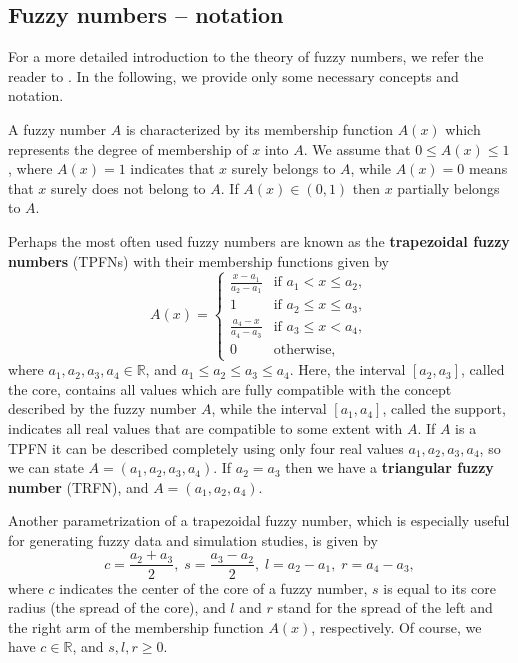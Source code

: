 \subsection{Fuzzy numbers -- notation}

For a more detailed introduction to the theory of fuzzy numbers,  we refer the reader to \cite{ban_coroianu_pg}.
In the following, we provide only some necessary concepts and notation.

A fuzzy number $A$ is characterized by its membership function $A(x)$ which represents the degree of membership of $x$ into $A$. We assume that $0\leqslant A(x)\leqslant 1$, where $A(x)=1$ indicates that $x$ surely belongs to $A$, while $A(x)=0$ means that $x$ surely does not belong to $A$. If $A(x)\in (0,1)$ then $x$ partially belongs to $A$.

Perhaps the most often used fuzzy numbers are known as the \textbf{trapezoidal fuzzy numbers} (TPFNs) with their membership functions given by
\begin{equation}
A(x)=\begin{cases}
\frac{x-a_1}{a_2-a_1} & \text{if } a_1<x\leqslant a_2, \\
1 & \text{if } a_2\leqslant x\leqslant a_3, \\
\frac{a_4-x}{a_4-a_3} & \text{if } a_3\leqslant x<a_4, \\
0 & \text{otherwise},
\end{cases}
\label{eq:TPFN} 
\end{equation}
where $a_1,a_2,a_3,a_4\in\mathbb{R}$, and $a_1\leqslant a_2\leqslant a_3\leqslant a_4$. Here, the interval $[a_2,a_3]$, called the core, contains
all values which are fully compatible with the concept described by the fuzzy number $A$, while the interval $[a_1,a_4]$, called the support, indicates all real values that are compatible to some extent with $A$.
If $A$ is a TPFN it can be described completely using only four real values $a_1,a_2,a_3,a_4$, so we can state $A=(a_1, a_2, a_3, a_4)$.
If $a_2=a_3$ then we have a \textbf{triangular fuzzy number} (TRFN), and $A = (a_1, a_2, a_4)$.

Another parametrization of a trapezoidal fuzzy number, which is especially useful for generating fuzzy data and simulation studies, is given by
\begin{equation}
c  =\frac{a_2+a_3}{2}, \; 
s =\frac{a_3-a_2}{2}, \;
l =a_2-a_1, \;
r =a_4-a_3 ,
\label{eq:cslr}
\end{equation}
where $c$ indicates the center of the core of a fuzzy number, $s$ is equal to its core radius (the spread of the core), and $l$ and $r$ stand for the spread of the left and the right arm of the membership function $A(x)$, respectively.
Of course, we have $c\in\mathbb{R}$, and $s,l,r\geqslant 0$.

